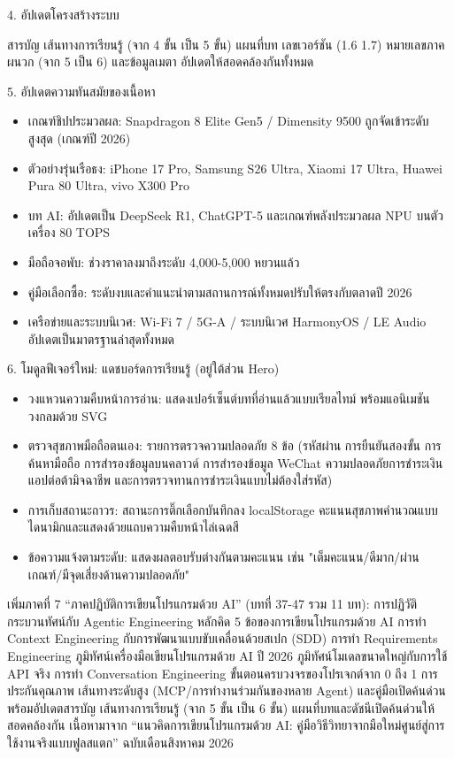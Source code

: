 4. อัปเดตโครงสร้างระบบ

สารบัญ เส้นทางการเรียนรู้ (จาก 4 ขั้น เป็น 5 ขั้น) แผนที่บท เลขเวอร์ชัน (1.6 1.7) หมายเลขภาคผนวก (จาก 5 เป็น 6) และข้อมูลเมตา อัปเดตให้สอดคล้องกันทั้งหมด

5. อัปเดตความทันสมัยของเนื้อหา

\begin{itemize}
  \item เกณฑ์ชิปประมวลผล: Snapdragon 8 Elite Gen5 / Dimensity 9500 ถูกจัดเข้าระดับสูงสุด (เกณฑ์ปี 2026)
  \item ตัวอย่างรุ่นเรือธง: iPhone 17 Pro, Samsung S26 Ultra, Xiaomi 17 Ultra, Huawei Pura 80 Ultra, vivo X300 Pro
  \item บท AI: อัปเดตเป็น DeepSeek R1, ChatGPT-5 และเกณฑ์พลังประมวลผล NPU บนตัวเครื่อง 80 TOPS
  \item มือถือจอพับ: ช่วงราคาลงมาถึงระดับ 4,000-5,000 หยวนแล้ว
  \item คู่มือเลือกซื้อ: ระดับงบและคำแนะนำตามสถานการณ์ทั้งหมดปรับให้ตรงกับตลาดปี 2026
  \item เครือข่ายและระบบนิเวศ: Wi-Fi 7 / 5G-A / ระบบนิเวศ HarmonyOS / LE Audio อัปเดตเป็นมาตรฐานล่าสุดทั้งหมด
\end{itemize}

6. โมดูลฟีเจอร์ใหม่: แดชบอร์ดการเรียนรู้ (อยู่ใต้ส่วน Hero)

\begin{itemize}
  \item วงแหวนความคืบหน้าการอ่าน: แสดงเปอร์เซ็นต์บทที่อ่านแล้วแบบเรียลไทม์ พร้อมแอนิเมชันวงกลมด้วย SVG
  \item ตรวจสุขภาพมือถือตนเอง: รายการตรวจความปลอดภัย 8 ข้อ (รหัสผ่าน การยืนยันสองขั้น การค้นหามือถือ การสำรองข้อมูลบนคลาวด์ การสำรองข้อมูล WeChat ความปลอดภัยการชำระเงิน แอปต่อต้ามิจฉาชีพ และการตรวจทานการชำระเงินแบบไม่ต้องใส่รหัส)
  \item การเก็บสถานะถาวร: สถานะการติ๊กเลือกบันทึกลง localStorage คะแนนสุขภาพคำนวณแบบไดนามิกและแสดงด้วยแถบความคืบหน้าไล่เฉดสี
  \item ข้อความแจ้งตามระดับ: แสดงผลตอบรับต่างกันตามคะแนน เช่น "เต็มคะแนน/ดีมาก/ผ่านเกณฑ์/มีจุดเสี่ยงด้านความปลอดภัย"
\end{itemize}


เพิ่มภาคที่ 7 “ภาคปฏิบัติการเขียนโปรแกรมด้วย AI” (บทที่ 37-47 รวม 11 บท): การปฏิวัติกระบวนทัศน์กับ Agentic Engineering หลักคิด 5 ข้อของการเขียนโปรแกรมด้วย AI การทำ Context Engineering กับการพัฒนาแบบขับเคลื่อนด้วยสเปก (SDD) การทำ Requirements Engineering ภูมิทัศน์เครื่องมือเขียนโปรแกรมด้วย AI ปี 2026 ภูมิทัศน์โมเดลขนาดใหญ่กับการใช้ API จริง การทำ Conversation Engineering ขั้นตอนครบวงจรของโปรเจกต์จาก 0 ถึง 1 การประกันคุณภาพ เส้นทางระดับสูง (MCP/การทำงานร่วมกันของหลาย Agent) และคู่มือเปิดค้นด่วน พร้อมอัปเดตสารบัญ เส้นทางการเรียนรู้ (จาก 5 ขั้น เป็น 6 ขั้น) แผนที่บทและดัชนีเปิดค้นด่วนให้สอดคล้องกัน เนื้อหามาจาก “แนวคิดการเขียนโปรแกรมด้วย AI: คู่มือวิธีวิทยาจากมือใหม่ศูนย์สู่การใช้งานจริงแบบฟูลสแตก” ฉบับเดือนสิงหาคม 2026

